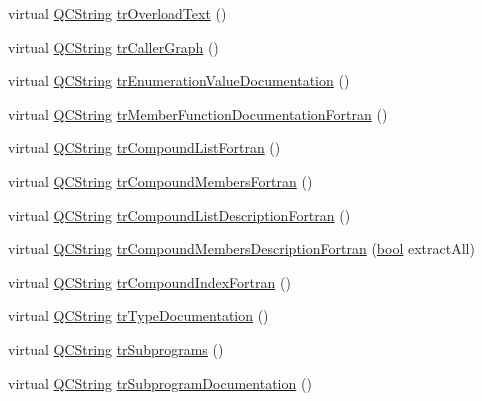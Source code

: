 \begin{DoxyCompactItemize}
\item 
virtual \hyperlink{class_q_c_string}{Q\+C\+String} \hyperlink{class_translator_serbian_cyrillic_a623839d48b9ac5d1ad1fc97d2a57fb6f}{tr\+Overload\+Text} ()
\item 
virtual \hyperlink{class_q_c_string}{Q\+C\+String} \hyperlink{class_translator_serbian_cyrillic_a0fbcd6cd269a58db86c102c52543bcd2}{tr\+Caller\+Graph} ()
\item 
virtual \hyperlink{class_q_c_string}{Q\+C\+String} \hyperlink{class_translator_serbian_cyrillic_ab9cbf7b65ec04f3ba87b8fd75644089f}{tr\+Enumeration\+Value\+Documentation} ()
\item 
virtual \hyperlink{class_q_c_string}{Q\+C\+String} \hyperlink{class_translator_serbian_cyrillic_a8178707506520839986ec5fb9c0ed15c}{tr\+Member\+Function\+Documentation\+Fortran} ()
\item 
virtual \hyperlink{class_q_c_string}{Q\+C\+String} \hyperlink{class_translator_serbian_cyrillic_af41751117c30cc203e4c8cb9d95aa6db}{tr\+Compound\+List\+Fortran} ()
\item 
virtual \hyperlink{class_q_c_string}{Q\+C\+String} \hyperlink{class_translator_serbian_cyrillic_a4f89810a951a24422c8b8709a65c0f5d}{tr\+Compound\+Members\+Fortran} ()
\item 
virtual \hyperlink{class_q_c_string}{Q\+C\+String} \hyperlink{class_translator_serbian_cyrillic_a507ea96f1954ff6756427f1a7c8cf5bb}{tr\+Compound\+List\+Description\+Fortran} ()
\item 
virtual \hyperlink{class_q_c_string}{Q\+C\+String} \hyperlink{class_translator_serbian_cyrillic_a8331ad7b47ba949ad9f7540c63d954c0}{tr\+Compound\+Members\+Description\+Fortran} (\hyperlink{qglobal_8h_a1062901a7428fdd9c7f180f5e01ea056}{bool} extract\+All)
\item 
virtual \hyperlink{class_q_c_string}{Q\+C\+String} \hyperlink{class_translator_serbian_cyrillic_a3ea8bdb8a6884a0cc1e80e9705e9146e}{tr\+Compound\+Index\+Fortran} ()
\item 
virtual \hyperlink{class_q_c_string}{Q\+C\+String} \hyperlink{class_translator_serbian_cyrillic_ac560f2984b67ce39d50eeafa926963f1}{tr\+Type\+Documentation} ()
\item 
virtual \hyperlink{class_q_c_string}{Q\+C\+String} \hyperlink{class_translator_serbian_cyrillic_a13c7629bcb37b472e4601a42ac30af47}{tr\+Subprograms} ()
\item 
virtual \hyperlink{class_q_c_string}{Q\+C\+String} \hyperlink{class_translator_serbian_cyrillic_aac60333c685f46fe9c49597e39d75c7b}{tr\+Subprogram\+Documentation} ()

\end{DoxyCompactItemize}
